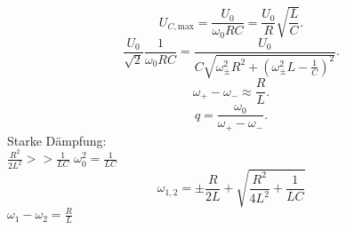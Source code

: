 \begin{equation*}
    U_{C,\text{max}} = \frac{U_0}{ω_0RC} = \frac{U_0}{R}\sqrt{\frac{L}{C}}.
\end{equation*}
\begin{equation*}
    \frac{U_0}{\sqrt{2}} \frac{1}{ω_0RC} = \frac{U_0}{C\sqrt{ω_{\pm}^2R^2 + \left(ω_{\pm}^2L - \frac{1}{C}\right)^2}}.
\end{equation*}
\begin{equation*}
    ω_+ - ω_- \approx \frac{R}{L}.
\end{equation*}
\begin{equation*}
    q = \frac{ω_0}{ω_+ - ω_-}.
\end{equation*}
Starke Dämpfung:\\ $\frac{R^2}{2L^2} >> \frac{1}{LC}$
$ω_0^2 = \frac{1}{LC}$
\begin{equation}\label{eq:w12}
    ω_{1,2} = \pm \frac{R}{2L} + \sqrt{\frac{R^2}{4L^2} + \frac{1}{LC}}
\end{equation}
$ω_1 - ω_2 = \frac{R}{L}$
